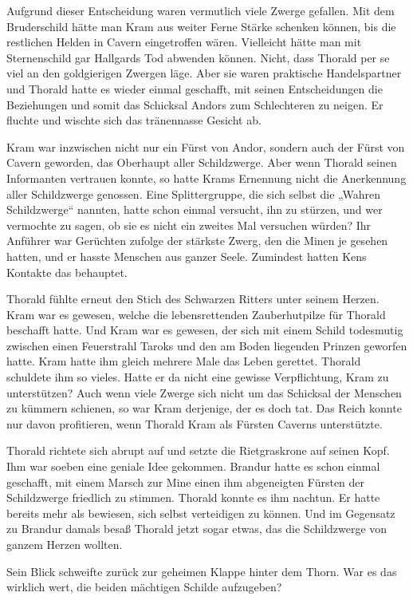 \documentclass[10pt, a4paper, oneside]{book}
\begin{document}
Aufgrund dieser Entscheidung waren vermutlich viele Zwerge gefallen. Mit dem Bruderschild hätte man Kram aus weiter Ferne Stärke schenken können, bis die restlichen Helden in Cavern eingetroffen wären. Vielleicht hätte man mit Sternenschild gar Hallgards Tod abwenden können. Nicht, dass Thorald per se viel an den goldgierigen Zwergen läge. Aber sie waren praktische Handelspartner und Thorald hatte es wieder einmal geschafft, mit seinen Entscheidungen die Beziehungen und somit das Schicksal Andors zum Schlechteren zu neigen. Er fluchte und wischte sich das tränennasse Gesicht ab.

Kram war inzwischen nicht nur ein Fürst von Andor, sondern auch der Fürst von Cavern geworden, das Oberhaupt aller Schildzwerge. Aber wenn Thorald seinen Informanten vertrauen konnte, so hatte Krams Ernennung nicht die Anerkennung aller Schildzwerge genossen. Eine Splittergruppe, die sich selbst die „Wahren Schildzwerge“ nannten, hatte schon einmal versucht, ihn zu stürzen, und wer vermochte zu sagen, ob sie es nicht ein zweites Mal versuchen würden? Ihr Anführer war Gerüchten zufolge der stärkste Zwerg, den die Minen je gesehen hatten, und er hasste Menschen aus ganzer Seele. Zumindest hatten Kens Kontakte das behauptet.

Thorald fühlte erneut den Stich des Schwarzen Ritters unter seinem Herzen. Kram war es gewesen, welche die lebensrettenden Zauberhutpilze für Thorald beschafft hatte. Und Kram war es gewesen, der sich mit einem Schild todesmutig zwischen einen Feuerstrahl Taroks und den am Boden liegenden Prinzen geworfen hatte. Kram hatte ihm gleich mehrere Male das Leben gerettet. Thorald schuldete ihm so vieles. Hatte er da nicht eine gewisse Verpflichtung, Kram zu unterstützen? Auch wenn viele Zwerge sich nicht um das Schicksal der Menschen zu kümmern schienen, so war Kram derjenige, der es doch tat. Das Reich konnte nur davon profitieren, wenn Thorald Kram als Fürsten Caverns unterstützte.

Thorald richtete sich abrupt auf und setzte die Rietgraskrone auf seinen Kopf. Ihm war soeben eine geniale Idee gekommen. Brandur hatte es schon einmal geschafft, mit einem Marsch zur Mine einen ihm abgeneigten Fürsten der Schildzwerge friedlich zu stimmen. Thorald konnte es ihm nachtun. Er hatte bereits mehr als bewiesen, sich selbst verteidigen zu können. Und im Gegensatz zu Brandur damals besaß Thorald jetzt sogar etwas, das die Schildzwerge von ganzem Herzen wollten.

Sein Blick schweifte zurück zur geheimen Klappe hinter dem Thorn. War es das wirklich wert, die beiden mächtigen Schilde aufzugeben?
\end{document}
